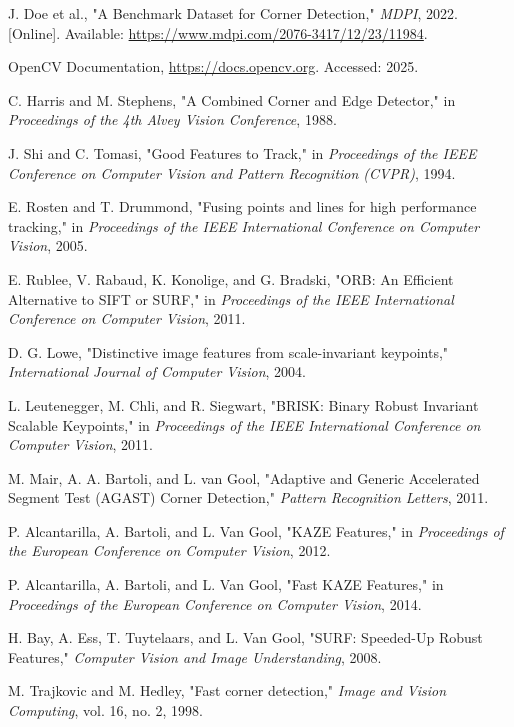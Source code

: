 \documentclass[journal]{IEEEtran}
\begin{document}
\begin{thebibliography}{1}

    J. Doe et al., "A Benchmark Dataset for Corner Detection," \textit{MDPI}, 2022. [Online]. Available: \url{https://www.mdpi.com/2076-3417/12/23/11984}.
    
    OpenCV Documentation, \url{https://docs.opencv.org}. Accessed: 2025.

    C. Harris and M. Stephens, "A Combined Corner and Edge Detector," in \textit{Proceedings of the 4th Alvey Vision Conference}, 1988.
    
    J. Shi and C. Tomasi, "Good Features to Track," in \textit{Proceedings of the IEEE Conference on Computer Vision and Pattern Recognition (CVPR)}, 1994.
    
    E. Rosten and T. Drummond, "Fusing points and lines for high performance tracking," in \textit{Proceedings of the IEEE International Conference on Computer Vision}, 2005.
    
    E. Rublee, V. Rabaud, K. Konolige, and G. Bradski, "ORB: An Efficient Alternative to SIFT or SURF," in \textit{Proceedings of the IEEE International Conference on Computer Vision}, 2011.

    D. G. Lowe, "Distinctive image features from scale-invariant keypoints," \textit{International Journal of Computer Vision}, 2004.

    L. Leutenegger, M. Chli, and R. Siegwart, "BRISK: Binary Robust Invariant Scalable Keypoints," in \textit{Proceedings of the IEEE International Conference on Computer Vision}, 2011.

    M. Mair, A. A. Bartoli, and L. van Gool, "Adaptive and Generic Accelerated Segment Test (AGAST) Corner Detection," \textit{Pattern Recognition Letters}, 2011.
    
    P. Alcantarilla, A. Bartoli, and L. Van Gool, "KAZE Features," in \textit{Proceedings of the European Conference on Computer Vision}, 2012.

    P. Alcantarilla, A. Bartoli, and L. Van Gool, "Fast KAZE Features," in \textit{Proceedings of the European Conference on Computer Vision}, 2014.

    H. Bay, A. Ess, T. Tuytelaars, and L. Van Gool, "SURF: Speeded-Up Robust Features," \textit{Computer Vision and Image Understanding}, 2008.
    
    M. Trajkovic and M. Hedley, "Fast corner detection," \textit{Image and Vision Computing}, vol. 16, no. 2, 1998.

\end{thebibliography}
\end{document}
